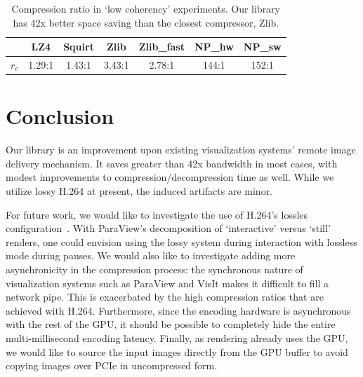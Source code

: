 \documentclass[review]{vgtc}                 %
\begin{document}
\begin{table}[htb]
  \caption{Compression ratio in `low coherency' experiments. Our library has 42x
   better space saving than the closest compressor, Zlib.}
  \label{tab:latency}
  \scriptsize
  \begin{center}
    \begin{tabular}{ccccccc}
      & LZ4 & Squirt & Zlib & Zlib\_fast & NP\_hw & NP\_sw \\
    \hline
      \(r_c\) & 1.29:1 & 1.43:1 & 3.43:1 & 2.78:1 & 144:1 & 152:1 \\
    \end{tabular}
  \end{center}
\end{table}


\section{Conclusion}


Our library is an improvement upon existing visualization systems'
remote image delivery mechanism.  It saves greater than 42x bandwidth
in most cases, with modest improvements to compression/decompression
time as well.  While we utilize lossy H.264 at present, the induced
artifacts are minor.


For future work, we would like to investigate the use of H.264's
lossles configuration~\cite{sullivan2012overview}.  With ParaView's
decomposition of `interactive' versus `still' renders, one could
envision using the lossy system during interaction with lossless
mode during pauses.  We would also like to investigate adding more
asynchronicity in the compression process: the synchronous nature of
visualization systems such as ParaView and VisIt makes it difficult
to fill a network pipe.  This is exacerbated by the high compression
ratios that are achieved with H.264.  Furthermore, since the encoding
hardware is asynchronous with the rest of the GPU, it should be
possible to completely hide the entire multi-millisecond encoding
latency.  Finally, as rendering already uses the GPU, we would like to
source the input images directly from the GPU buffer to avoid copying
images over PCIe in uncompressed form.
\end{document}
